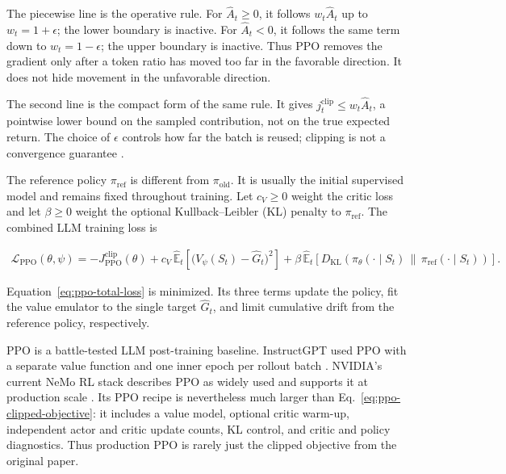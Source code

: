 \documentclass[11pt]{article}
\newcommand{\E}{\mathbb{E}}
\newcommand{\KL}{D_{\mathrm{KL}}}
\begin{document}
The piecewise line is the operative rule.  For \(\widehat A_t\geq0\), it
follows \(w_t\widehat A_t\) up to \(w_t=1+\epsilon\); the lower boundary is
inactive.  For \(\widehat A_t<0\), it follows the same term down to
\(w_t=1-\epsilon\); the upper boundary is inactive.  Thus PPO removes the
gradient only after a token ratio has moved too far in the favorable
direction.  It does not hide movement in the unfavorable direction.

The second line is the compact form of the same rule.  It gives
\(j_t^{\mathrm{clip}}\leq w_t\widehat A_t\), a pointwise lower bound on the
sampled contribution, not on the true expected return.  The choice of
\(\epsilon\) controls how far the batch is reused; clipping is not a
convergence guarantee \cite{wang2020trulyppo}.

The reference policy \(\pi_{\mathrm{ref}}\) is different from
\(\pi_{\mathrm{old}}\).  It is usually the initial supervised model and
remains fixed throughout training.  Let \(c_V\geq0\) weight the critic loss
and let \(\beta\geq0\) weight the optional Kullback--Leibler (KL) penalty to
\(\pi_{\mathrm{ref}}\).  The combined LLM training loss is
\cite{schulman2017ppo,ouyang2022instructgpt}

\begin{equation}
    \begin{split}
    \mathcal L_{\mathrm{PPO}}(\theta,\psi)
      =-J_{\mathrm{PPO}}^{\mathrm{clip}}(\theta)
       +c_V\,\widehat{\E}_t
        \left[
          \bigl(V_\psi(S_t)-\widehat G_t\bigr)^2
        \right]
       +\beta\,\widehat{\E}_t
        \left[
          \KL\!\left(
          \pi_\theta(\cdot\mid S_t)
          \,\|\,\pi_{\mathrm{ref}}(\cdot\mid S_t)
          \right)
        \right].
    \end{split}
    \label{eq:ppo-total-loss}
\end{equation}

Equation~\eqref{eq:ppo-total-loss} is minimized.  Its three terms update the
policy, fit the value emulator to the single target \(\widehat G_t\), and
limit cumulative drift from the reference policy, respectively.

PPO is a battle-tested LLM post-training baseline.  InstructGPT used PPO with
a separate value function and one inner epoch per rollout batch
\cite{ouyang2022instructgpt}.  NVIDIA's current NeMo RL stack describes PPO as
widely used and supports it at production scale \cite{nvidia2026ppo}.  Its PPO
recipe is nevertheless much larger than Eq.~\eqref{eq:ppo-clipped-objective}:
it includes a value model, optional critic warm-up, independent actor and
critic update counts, KL control, and critic and policy diagnostics.  Thus
production PPO is rarely just the clipped objective from the original paper.
\end{document}
